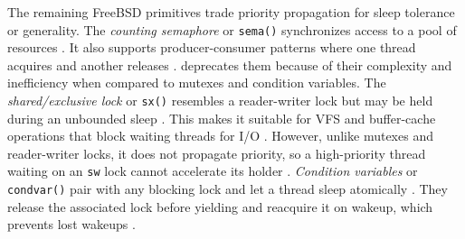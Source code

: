 The remaining FreeBSD primitives trade priority propagation for sleep tolerance or generality. The \textit{counting semaphore} or
\texttt{sema()} synchronizes access to a pool of resources \parencite{freebsd_sema}. It also supports producer-consumer
patterns where one thread acquires and another releases \parencite{freebsd_sema}. \textcite{freebsd_sema} deprecates them
because of their complexity and inefficiency when compared to mutexes and condition variables. The \textit{shared/exclusive lock}
or \texttt{sx()} resembles a reader-writer lock but may be held during an unbounded sleep \parencite{freebsd_locking}.
This makes it suitable for VFS and buffer-cache operations that block waiting threads for I/O \parencite{freebsd_locking}.
However, unlike mutexes and reader-writer locks, it does not propagate priority, so a high-priority thread waiting on an
\texttt{sw} lock cannot accelerate its holder \parencite{freebsd_locking}. \textit{Condition variables} or \texttt{condvar()}
pair with any blocking lock and let a thread sleep atomically \parencite{freebsd_locking}. They release the associated
lock before yielding and reacquire it on wakeup, which prevents lost wakeups \parencite{freebsd_locking}.

